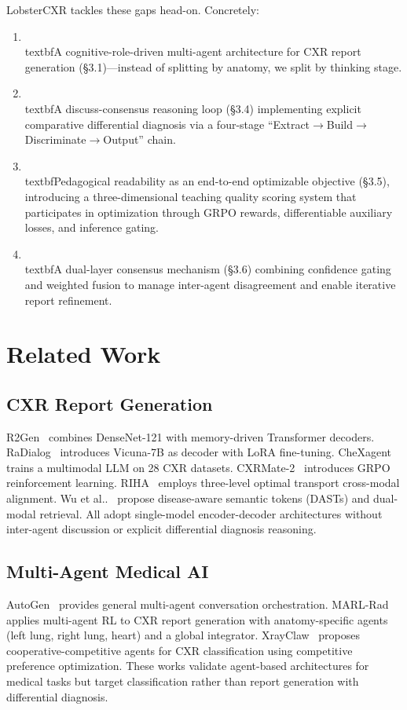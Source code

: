 \documentclass[runningheads,10pt]{llncs}
\begin{document}
LobsterCXR tackles these gaps head-on. Concretely:
\begin{enumerate}
 \item \\textbf{A cognitive-role-driven multi-agent architecture} for CXR report generation (\S3.1)---instead of splitting by anatomy, we split by thinking stage.
 \item \\textbf{A discuss-consensus reasoning loop} (\S3.4) implementing explicit comparative differential diagnosis via a four-stage ``Extract$\to$Build$\to$Discriminate$\to$Output'' chain.
 \item \\textbf{Pedagogical readability as an end-to-end optimizable objective} (\S3.5), introducing a three-dimensional teaching quality scoring system that participates in optimization through GRPO rewards, differentiable auxiliary losses, and inference gating.
 \item \\textbf{A dual-layer consensus mechanism} (\S3.6) combining confidence gating and weighted fusion to manage inter-agent disagreement and enable iterative report refinement.
\end{enumerate}

\section{Related Work}

\subsection{CXR Report Generation}
R2Gen~\cite{r2gen} combines DenseNet-121 with memory-driven Transformer decoders. RaDialog~\cite{radialog} introduces Vicuna-7B as decoder with LoRA fine-tuning. CheXagent~\cite{chexagent} trains a multimodal LLM on 28 CXR datasets. CXRMate-2~\cite{cxrmate2} introduces GRPO reinforcement learning. RIHA~\cite{riha} employs three-level optimal transport cross-modal alignment. Wu et al..~\cite{diseaseaware} propose disease-aware semantic tokens (DASTs) and dual-modal retrieval. All adopt single-model encoder-decoder architectures without inter-agent discussion or explicit differential diagnosis reasoning.

\subsection{Multi-Agent Medical AI}
AutoGen~\cite{autogen} provides general multi-agent conversation orchestration. MARL-Rad~\cite{marlrad} applies multi-agent RL to CXR report generation with anatomy-specific agents (left lung, right lung, heart) and a global integrator. XrayClaw~\cite{xrayclaw} proposes cooperative-competitive agents for CXR classification using competitive preference optimization. These works validate agent-based architectures for medical tasks but target classification rather than report generation with differential diagnosis.
\end{document}
